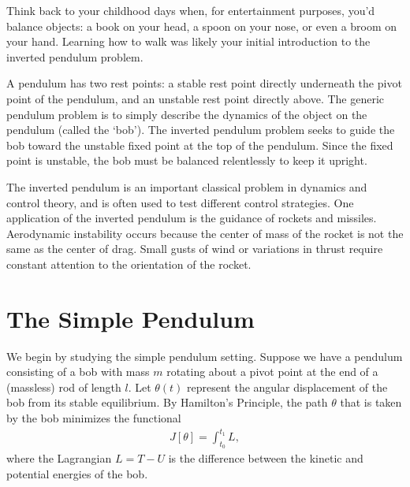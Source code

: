\label{lab:inverted_pendulum}



Think back to your childhood days when, for entertainment purposes, you'd balance objects: a book on your head, a spoon on your nose, or even a broom on your hand.
 Learning how to walk was likely your initial introduction to the inverted pendulum problem.

A pendulum has two rest points: a stable rest point directly underneath the pivot point of the pendulum, and an unstable rest point directly above.
The generic pendulum problem is to simply describe the dynamics of the object on the pendulum (called the `bob').
The inverted pendulum problem seeks to guide the bob toward the unstable fixed point at the top of the pendulum.
Since the fixed point is unstable, the bob must be balanced relentlessly to keep it upright.

The inverted pendulum is an important classical problem in dynamics and control theory, and is often used to test different control strategies. One application of the inverted pendulum is the guidance of rockets and missiles. Aerodynamic instability occurs because the center of mass of the rocket is not the same as the center of drag. Small gusts of wind or variations in thrust require constant attention to the orientation of the rocket.


\section*{The Simple Pendulum}
We begin by studying the simple pendulum setting.
Suppose we have a pendulum consisting of a bob with mass $m$ rotating about a pivot point at the end of a (massless) rod of length $l$.
Let $\theta(t)$ represent the angular displacement of the bob from its stable equilibrium.
By Hamilton's Principle, the path $\theta$ that is taken by the bob minimizes the functional
\begin{align}
J[\theta] = \int_{t_0}^{t_1}	L,
\end{align}
where the Lagrangian $L = T - U$ is the difference between the kinetic and potential energies of the bob.

